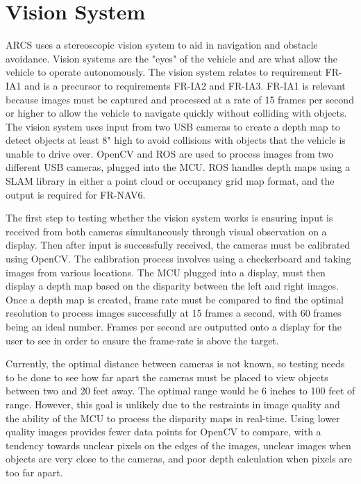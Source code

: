 \documentclass[compsoc,draftclsnofoot,onecolumn,10pt]{IEEEtran}
\begin{document}
\section{Vision System}
ARCS uses a stereoscopic vision system to aid in navigation and obstacle avoidance. 
Vision systems are the "eyes" of the vehicle and are what allow the vehicle to operate autonomously. 
The vision system relates to requirement FR-IA1 and is a precursor to requirements FR-IA2 and FR-IA3. 
FR-IA1 is relevant because images must be captured and processed at a rate of 15 frames per second or higher to allow the vehicle to navigate quickly without colliding with objects.
The vision system uses input from two USB cameras to create a depth map to detect objects at least 8" high to avoid collisions with objects that the vehicle is unable to drive over. 
OpenCV and ROS are used to process images from two different USB cameras, plugged into the MCU.  
ROS handles depth maps using a SLAM library in either a point cloud or occupancy grid map format, and the output is required for FR-NAV6. \par
The first step to testing whether the vision system works is ensuring input is received from both cameras simultaneously through visual observation on a display. Then after input is successfully received, the cameras must be calibrated using OpenCV. The calibration process involves using a checkerboard and taking images from various locations. The MCU plugged into a display, must then display a depth map based on the disparity between the left and right images. 
Once a depth map is created, frame rate must be compared to find the optimal resolution to process images successfully at 15 frames a second, with 60 frames being an ideal number. Frames per second are outputted onto a display for the user to see in order to ensure the frame-rate is above the target. \par
Currently, the optimal distance between cameras is not known, so testing needs to be done to see how far apart the cameras must be placed to view objects between two and 20 feet away. The optimal range would be 6 inches to 100 feet of range. However, this goal is unlikely due to the restraints in image quality and the ability of the MCU to process the disparity maps in real-time. Using lower quality images provides fewer data points for OpenCV to compare, with a tendency towards unclear pixels on the edges of the images, unclear images when objects are very close to the cameras, and poor depth calculation when pixels are too far apart. \par
\end{document}
